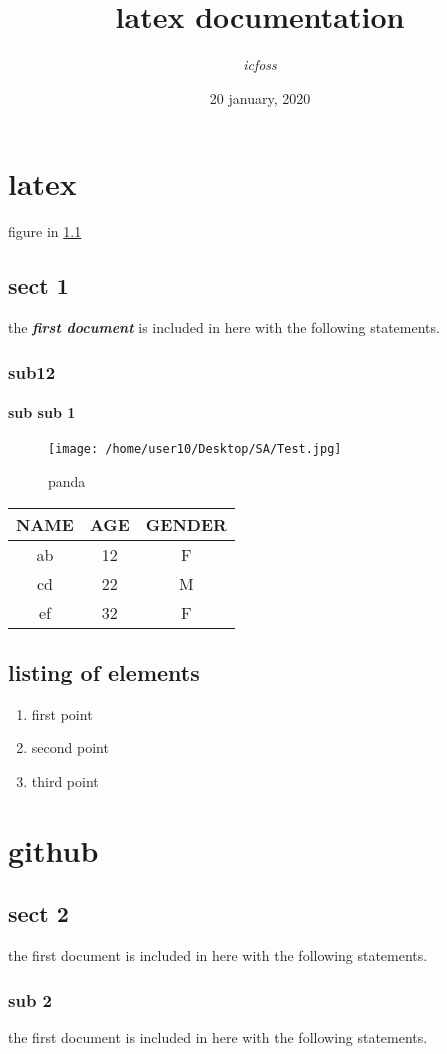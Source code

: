 \documentclass[12pt]{report} %
\begin{document}
\title{\textbf{latex documentation}}
\author{\textit{icfoss}}
\date{20 january, 2020 }
\maketitle

\chapter{latex}
figure in \ref{a:L1}
\section*{sect 1}
the \textit{\textbf{first document}} is included in here with the following statements.
\subsection{sub12 }\subsubsection{sub sub 1}
\begin{figure}[H]
\centering
\texttt{[image: /home/user10/Desktop/SA/Test.jpg]}
\caption{panda}
\label{a:L1}
\end{figure}
\begin{center}
\begin{tabular}{|c|c|c|}
\hline
NAME & AGE & GENDER\\
\hline
ab & 12 & F\\
\hline
cd & 22 & M\\
\hline
ef & 32 & F\\
\hline
\end{tabular}
\end{center}
\section{listing of elements}
\begin{enumerate}[label=\alph*]
\item first point
\item second point
\item third point
\end{enumerate}



\chapter{github}
\section*{sect 2}
the first document is included in here with the following statements.
\subsection*{sub 2}the first document is included in here with the following statements.
\end{document}
